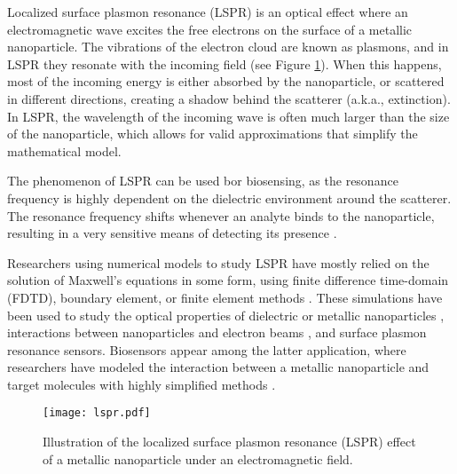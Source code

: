 
Localized surface plasmon resonance (LSPR) is an optical effect where an 
electromagnetic wave excites the free electrons on the surface of a metallic nanoparticle.
The vibrations of the electron cloud are known as plasmons, and in LSPR they resonate with the incoming
field (see Figure \ref{fig:lspr}). When this happens, most of the incoming energy
is either absorbed by the nanoparticle, or scattered in different directions,
creating a shadow behind the scatterer (a.k.a., extinction). In LSPR,
the wavelength of the incoming wave is often much larger than 
the size of the nanoparticle, 
which allows for valid approximations that simplify the mathematical model.

The phenomenon of LSPR can be used bor biosensing, 
as the resonance frequency is highly dependent on the dielectric environment 
around the scatterer. 
The resonance frequency shifts whenever an analyte binds to the nanoparticle, 
resulting in a very sensitive means of detecting its presence \cite{HaesETal2004, HaesVanduyne2002}.

Researchers using numerical models to study LSPR have mostly relied on the 
solution of Maxwell's equations in some form, using finite difference time-domain (FDTD),
boundary element, or finite element methods \cite{SolisTaboadaObelleiroLiz-MaarzanGarciadeabajo2014}. 
These simulations have been used to study the 
optical properties of dielectric or metallic nanoparticles \cite{Hohenester2018,HohenesterTrugler2012,
JungPedersenSondergaardPedersenLarsenNielsen2010, VideenSun2003,
MayergoyzFredkinZhang2005, MayergoyzZhang2007}, interactions between nanoparticles
and electron beams \cite{GarciadeabajoAizpurua1997, GarciadeabajoHowie2002},
and surface plasmon resonance sensors.
Biosensors appear among the latter application, where researchers have modeled the 
interaction between a metallic nanoparticle and target molecules with highly 
simplified methods \cite{JungCampbellChinowskyMarYee1998,HaesVanduyne2002,DavisGomezVernon2010,AntosiewiczApellClaudioKall2011}.

\begin{figure}[h] %
   \centering
   \texttt{[image: lspr.pdf]} 
   \caption{Illustration of the localized surface plasmon resonance (LSPR) effect of a metallic nanoparticle under an electromagnetic field. }
   \label{fig:lspr}
\end{figure}

